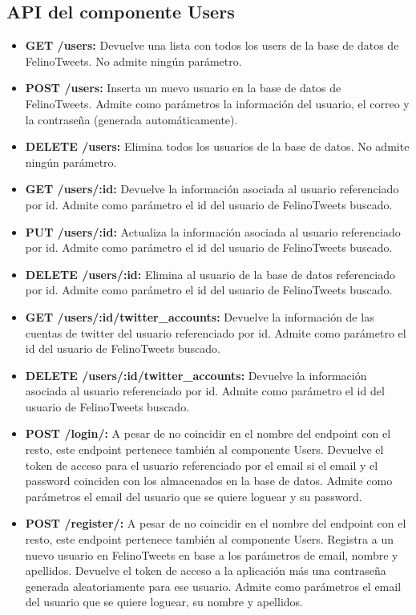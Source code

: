 \documentclass[a4paper]{article}
\begin{document}
	\subsection{API del componente Users}
	\begin{itemize}
		\item \textbf{GET /users:} Devuelve una lista con todos los users de la base de datos de FelinoTweets. No admite ningún parámetro.
		\item \textbf{POST /users:} Inserta un nuevo usuario en la base de datos de FelinoTweets. Admite como parámetros la información del usuario, el correo y la contraseña (generada automáticamente).
		\item \textbf{DELETE /users:} Elimina todos los usuarios de la base de datos. No admite ningún parámetro.
		\item \textbf{GET /users/:id:} Devuelve la información asociada al usuario referenciado por id. Admite como parámetro el id del usuario de FelinoTweets buscado.
		\item \textbf{PUT /users/:id:} Actualiza la información asociada al usuario referenciado por id. Admite como parámetro el id del usuario de FelinoTweets buscado.
		\item \textbf{DELETE /users/:id:} Elimina al usuario de la base de datos referenciado por id. Admite como parámetro el id del usuario de FelinoTweets buscado.
		\item \textbf{GET /users/:id/twitter\_accounts:} Devuelve la información de las cuentas de twitter del usuario referenciado por id. Admite como parámetro el id del usuario de FelinoTweets buscado.
		\item \textbf{DELETE /users/:id/twitter\_accounts:} Devuelve la información asociada al usuario referenciado por id. Admite como parámetro el id del usuario de FelinoTweets buscado.
		\item \textbf{POST /login/:} A pesar de no coincidir en el nombre del endpoint con el resto, este endpoint pertenece también al componente Users. Devuelve el token de acceso para el usuario referenciado por el email si el email y el password coinciden con los almacenados en la base de datos. Admite como parámetros el email del usuario que se quiere loguear y su password.
		\item \textbf{POST /register/:} A pesar de no coincidir en el nombre del endpoint con el resto, este endpoint pertenece también al componente Users. \newline Registra a un nuevo usuario en FelinoTweets en base a los parámetros de email, nombre y apellidos. Devuelve el token de acceso a la aplicación más una contraseña generada aleatoriamente para ese usuario. Admite como parámetros el email del usuario que se quiere loguear, su nombre y apellidos.
	\end{itemize}
\end{document}
